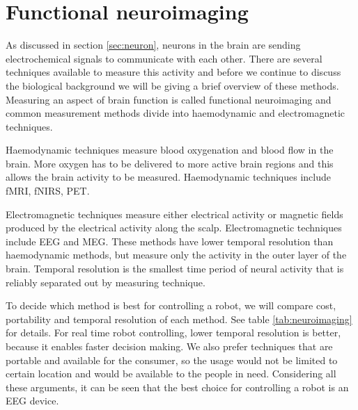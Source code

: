 \section{Functional neuroimaging}
\label{sec:neuroimaging}

As discussed in section \ref{sec:neuron}, neurons in the brain are sending electrochemical signals to communicate with each other. There are several techniques available to measure this activity and before we continue to discuss the biological background we will be giving a brief overview of these methods. Measuring an aspect of brain function is called functional neuroimaging and common measurement methods divide into haemodynamic and electromagnetic techniques.

Haemodynamic techniques measure blood oxygenation and blood flow in the brain. More oxygen has to be delivered to more active brain regions and this allows the brain activity to be measured. Haemodynamic techniques include \gls{fMRI}, \gls{fNIRS}, \gls{PET}.

Electromagnetic techniques measure either electrical activity or magnetic fields produced by the electrical activity along the scalp. Electromagnetic techniques include \gls{EEG} and \gls{MEG}. These methods have lower temporal resolution than haemodynamic methods, but measure only the activity in the outer layer of the brain. Temporal resolution is the smallest time period of neural activity that is reliably separated out by measuring technique.

To decide which method is best for controlling a robot, we will compare cost, portability and temporal resolution of each method. See table \ref{tab:neuroimaging} for details. For real time robot controlling, lower temporal resolution is better, because it enables faster decision making. We also prefer techniques that are portable and available for the consumer, so the usage would not be limited to certain location and would be available to the people in need. Considering all these arguments, it can be seen that the best choice for controlling a robot is an \gls{EEG} device.


\newcommand{\pMEG}{\tablefootnote{http://neurogadget.com/2012/12/15/inexpensive-magnetoencephalography-meg-system-could-be-available-at-every-hospital/6495}}
\newcommand{\pfMRI}{\tablefootnote{http://info.blockimaging.com/bid/92623/MRI-Machine-Cost-and-Price-Guide}}
\newcommand{\pPET}{\tablefootnote{http://info.blockimaging.com/bid/68875/How-Much-Does-a-PET-CT-Scanner-Cost}}
\newcommand{\pEEG}{\tablefootnote{http://en.wikipedia.org/wiki/Comparison\_of\_consumer\_brain-computer\_interfaces}}
\newcommand{\pNIRS}{\cite{NIRS}}
\newcommand{\tresol}{\cite{timeresol}}

